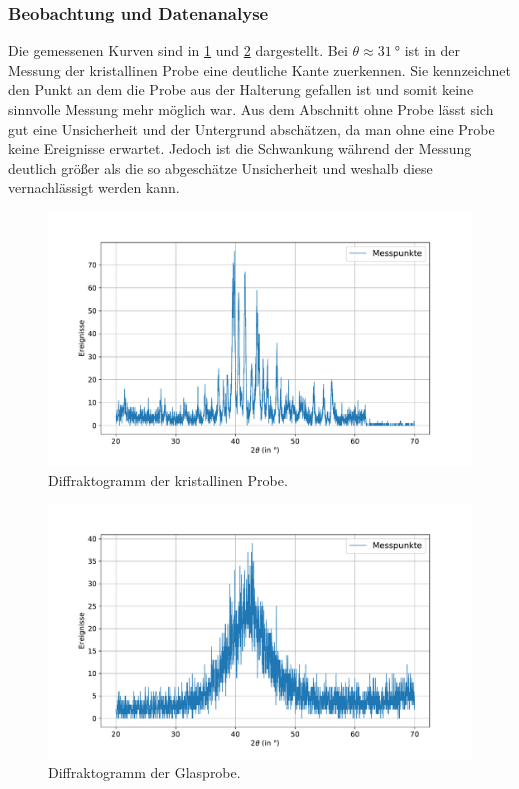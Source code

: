 \documentclass[
	a4paper,
	12pt,
	pagesize,
	ngerman
]{scrartcl}
\begin{document}
	\subsubsection{Beobachtung und Datenanalyse}
	Die gemessenen Kurven sind in \cref{fig_xrd_kristallin} und \cref{fig_xrd_glas} dargestellt.
	Bei $\theta \approx \SI{31}{\degree}$ ist in der Messung der kristallinen Probe eine deutliche Kante zuerkennen.
	Sie kennzeichnet den Punkt an dem die Probe aus der Halterung gefallen ist und somit keine sinnvolle Messung mehr möglich war.
	Aus dem Abschnitt ohne Probe lässt sich gut eine Unsicherheit und der Untergrund abschätzen, da man ohne eine Probe keine Ereignisse erwartet.
	Jedoch ist die Schwankung während der Messung deutlich größer als die so abgeschätze Unsicherheit und weshalb diese vernachlässigt werden kann. %
	\begin{figure}[H]
			\includegraphics[width=\linewidth]{img/XRD_Kristallin_45_25.pdf}
			\caption{Diffraktogramm der kristallinen Probe.}
			\label{fig_xrd_kristallin}
	\end{figure}
	\begin{figure}[H]
			\includegraphics[width=\linewidth]{img/XRD_Glas_45_25.pdf}
			\caption{Diffraktogramm der Glasprobe.}
			\label{fig_xrd_glas}
	\end{figure}
\end{document}
